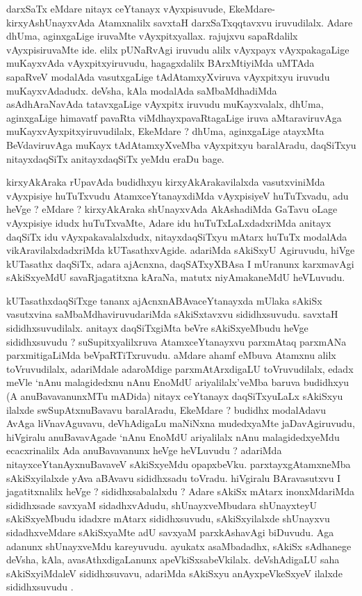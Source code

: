 \begin{artha}
darxSaTx eMdare nitayx ceYtanayx vAyxpisuvude, EkeMdare-kirxyAshUnayxvAda Atamxnalilx savxtaH darxSaTxqqtavxvu iruvudilalx. Adare dhUma, aginxgaLige iruvaMte vAyxpitxyallax. rajujxvu sapaRdalilx vAyxpisiruvaMte ide. elilx pUNaRvAgi iruvudu alilx vAyxpayx vAyxpakagaLige muKayxvAda vAyxpitxyiruvudu, hagagxdalilx BArxMtiyiMda uMTAda sapaRveV modalAda vasutxgaLige tAdAtamxyXviruva vAyxpitxyu iruvudu muKayxvAdadudx. deVsha, kAla modalAda saMbaMdhadiMda asAdhAraNavAda tatavxgaLige vAyxpitx iruvudu muKayxvalalx, dhUma, aginxgaLige himavatf pavaRta viMdhayxpavaRtagaLige iruva aMtaraviruvAga muKayxvAyxpitxyiruvudilalx, EkeMdare ? dhUma, aginxgaLige atayxMta BeVdaviruvAga muKayx tAdAtamxyXveMba vAyxpitxyu baralAradu, daqSiTxyu nitayxdaqSiTx anitayxdaqSiTx yeMdu eraDu bage.
\end{artha}

\begin{artha}
kirxyAkAraka rUpavAda budidhxyu kirxyAkArakavilalxda vasutxviniMda vAyxpisiye huTuTxvudu AtamxceYtanayxdiMda vAyxpisiyeV huTuTxvadu, adu heVge ? eMdare ? kirxyAkAraka shUnayxvAda AkAshadiMda GaTavu oLage vAyxpisiye idudx huTuTxvaMte, Adare idu huTuTxLaLxdadxriMda anitayx daqSiTx idu vAyxpakavalalxdudx, nitayxdaqSiTxyu mAtarx huTuTx modalAda vikAravilalxdadxriMda kUTasathxvAgide. adariMda sAkiSxyU Agiruvudu, hiVge kUTasathx daqSiTx, adara ajAcnxna, daqSATxyXBAsa I mUranunx karxmavAgi sAkiSxyeMdU savaRjagatitxna kAraNa, matutx niyAmakaneMdU heVLuvudu.
\end{artha}

\begin{artha}
kUTasathxdaqSiTxge tananx ajAcnxnABAvaceYtanayxda mUlaka sAkiSx vasutxvina saMbaMdhaviruvudariMda sAkiSxtavxvu sididhxsuvudu. savxtaH sididhxsuvudilalx. anitayx daqSiTxgiMta beVre sAkiSxyeMbudu heVge sididhxsuvudu ? suSupitxyalilxruva AtamxceYtanayxvu parxmAtaq parxmANa parxmitigaLiMda beVpaRTiTxruvudu. aMdare ahamf eMbuva Atamxnu alilx toVruvudilalx, adariMdale adaroMdige parxmAtArxdigaLU toVruvudilalx, edadx meVle `nAnu malagidedxnu nAnu EnoMdU ariyalilalx'veMba baruva budidhxyu (A anuBavavanunxMTu mADida) nitayx ceYtanayx daqSiTxyuLaLx sAkiSxyu ilalxde swSupAtxnuBavavu baralAradu, EkeMdare ? budidhx modalAdavu AvAga liVnavAguvavu, deVhAdigaLu maNiNxna mudedxyaMte jaDavAgiruvudu, hiVgiralu anuBavavAgade `nAnu EnoMdU ariyalilalx nAnu malagidedxyeMdu ecacxrinalilx Ada anuBavavanunx heVge heVLuvudu ? adariMda nitayxceYtanAyxnuBavaveV sAkiSxyeMdu opapxbeVku. parxtayxgAtamxneMba sAkiSxyilalxde yAva aBAvavu sididhxsadu toVradu. hiVgiralu BAravasutxvu I jagatitxnalilx heVge ? sididhxsabalalxdu ? Adare sAkiSx mAtarx inonxMdariMda sididhxsade savxyaM sidadhxvAdudu, shUnayxveMbudara shUnayxteyU sAkiSxyeMbudu idadxre mAtarx sididhxsuvudu, sAkiSxyilalxde shUnayxvu sidadhxveMdare sAkiSxyaMte adU savxyaM parxkAshavAgi biDuvudu. Aga adanunx shUnayxveMdu kareyuvudu. ayukatx asaMbadadhx, sAkiSx sAdhanege deVsha, kAla, avasAthxdigaLanunx apeVkiSxsabeVkilalx. deVshAdigaLU saha sAkiSxyiMdaleV sididhxsuvavu, adariMda sAkiSxyu anAyxpeVkeSxyeV ilalxde sididhxsuvudu .
\end{artha}

